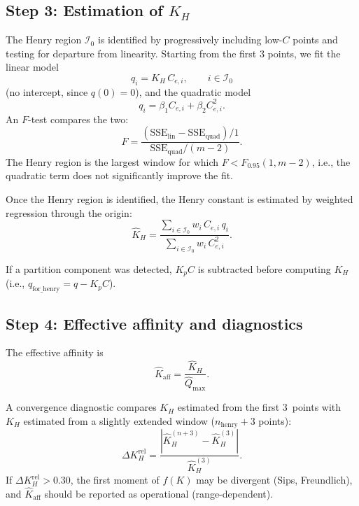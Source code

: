 \documentclass[12pt]{article}
\begin{document}
\subsection{Step 3: Estimation of $K_H$}

The Henry region $\mathcal{I}_0$ is identified by progressively
including low-$C$ points and testing for departure from linearity.
Starting from the first 3 points, we fit the linear model
\begin{equation}
  q_i = K_H\, C_{e,i},
  \qquad i \in \mathcal{I}_0
  \label{eq:henry_fit}
\end{equation}
(no intercept, since $q(0) = 0$), and the quadratic model
\begin{equation}
  q_i = \beta_1 C_{e,i} + \beta_2 C_{e,i}^2.
\end{equation}
An $F$-test compares the two:
\begin{equation}
  F = \frac{(\mathrm{SSE}_{\mathrm{lin}} - \mathrm{SSE}_{\mathrm{quad}})/1}
           {\mathrm{SSE}_{\mathrm{quad}} / (m-2)}.
  \label{eq:F_test}
\end{equation}
The Henry region is the largest window for which
$F < F_{0.95}(1, m-2)$, i.e., the quadratic term does not
significantly improve the fit.

Once the Henry region is identified, the Henry constant is estimated by
weighted regression through the origin:
\begin{equation}
  \widehat{K}_H
  = \frac{\sum_{i\in\mathcal{I}_0} w_i\, C_{e,i}\, q_i}
         {\sum_{i\in\mathcal{I}_0} w_i\, C_{e,i}^2}.
  \label{eq:KH_estimate}
\end{equation}

If a partition component was detected, $K_p C$ is subtracted before
computing $K_H$ (i.e., $q_{\mathrm{for\_henry}} = q - K_p C$).

\subsection{Step 4: Effective affinity and diagnostics}

The effective affinity is
\begin{equation}
  \widehat{K}_{\mathrm{aff}} = \frac{\widehat{K}_H}{\widehat{Q}_{\max}}.
\end{equation}

A convergence diagnostic compares $K_H$ estimated from the first
3~points with $K_H$ estimated from a slightly extended window
($n_{\mathrm{henry}} + 3$ points):
\begin{equation}
  \Delta K_H^{\mathrm{rel}}
  = \frac{|\widehat{K}_H^{(n+3)} - \widehat{K}_H^{(3)}|}
         {\widehat{K}_H^{(3)}}.
\end{equation}
If $\Delta K_H^{\mathrm{rel}} > 0.30$, the first moment of $f(K)$
may be divergent (Sips, Freundlich), and
$\widehat{K}_{\mathrm{aff}}$ should be reported as operational
(range-dependent).
\end{document}
